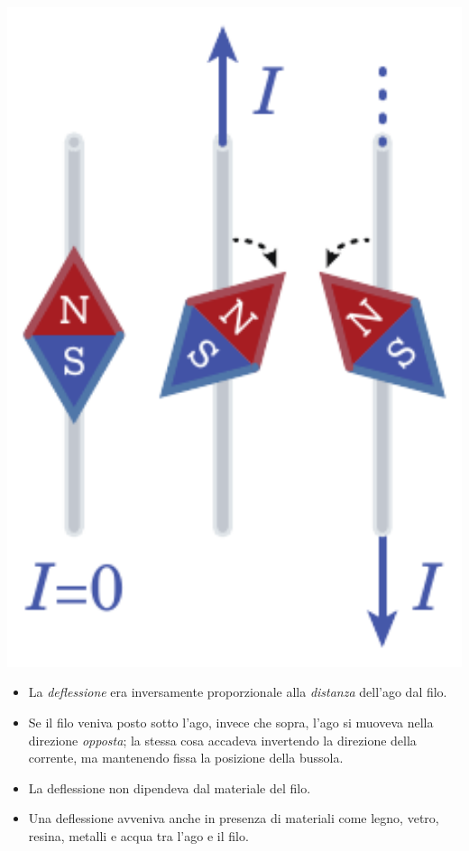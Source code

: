 \begin{minipage}{0.3\textwidth}
	\begin{center}
		\includegraphics[width=1\textwidth]{images/chp7/chp7oersted1.pdf}
	\end{center}
\end{minipage}\hspace{5pt}
\begin{minipage}{0.69\textwidth}
	\begin{itemize}
		\item La \textit{deflessione} era inversamente proporzionale alla \textit{distanza} dell'ago dal filo.
		\item Se il filo veniva posto sotto l'ago, invece che sopra, l'ago si muoveva nella direzione \textit{opposta}; la stessa cosa accadeva invertendo la direzione della corrente, ma mantenendo fissa la posizione della bussola.
		\item La deflessione non dipendeva dal materiale del filo.
		\item Una deflessione avveniva anche in presenza di materiali come legno, vetro, resina, metalli e acqua tra l'ago e il filo.
	\end{itemize}
\end{minipage}\\
